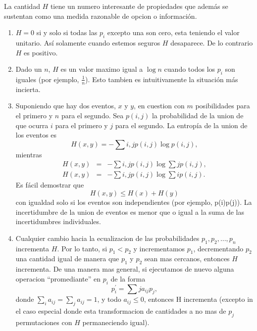 La cantidad $H$ tiene un numero interesante de propiedades que
adem\'{a}s se sustentan como una medida razonable de opcion o
informaci\'{o}n.
\begin{enumerate}
\item{$H = 0$ si y solo si todas las $p_{i}$ excepto una son cero,
  esta teniendo el valor unitario. As\'{i} solamente cuando estemos
  seguros $H$ desaparece. De lo contrario $H$ es positivo.}
\item{Dado un $n$, $H$ es un valor maximo igual a $\log n$ cuando
  todos los $p_{i}$ son iguales (por ejemplo, $\frac{1}{n}$). Esto
  tambien es intuitivamente la situaci\'{o}n m\'{a}s incierta.}
\item{Suponiendo que hay dos eventos, $x$ y $y$, en cuestion con $m$
  posibilidades para el primero y $n$ para el segundo. Sea $p(i,j)$ la
  probabilidad de la union de que ocurra $i$ para el primero y $j$
  para el segundo. La entrop\'{i}a de la union de los eventos es
  \begin{equation}
    H(x,y) = -\sum{i,j}{}p(i,j)\log p(i,j),
  \end{equation}
  mientras
  \begin{equation}
    \begin{array}{rcl}
      H(x,y) &=& -\sum{i,j}{}p(i,j)\log\sum{j}{}p(i,j), \\
      H(x,y) &=& -\sum{i,j}{}p(i,j)\log\sum{i}{}p(i,j).
    \end{array}
  \end{equation}
  Es f\'{a}cil demostrar que
  \begin{equation}
    H(x,y) \leq H(x) + H(y)
  \end{equation}
  con igualdad solo si los eventos son independientes (por ejemplo,
  p(i)p(j)). La incertidumbre de la union de eventos es menor que o
  igual a la suma de las incertidumbres individuales.}
\item{Cualquier cambio hacia la ecualizacion de las probabilidades
  $p_{1}, p_{2}, \ldots, p_{n}$ incrementa $H$. Por lo tanto, si
  $p_{1} < p_{2}$ y incrementamos $p_{1}$, decrementando $p_{2}$ una
  cantidad igual de manera que $p_{1}$ y $p_{2}$ sean mas cercanos,
  entonces $H$ incrementa. De una manera mas general, si ejecutamos de
  nuevo alguna operacion ``promediante'' en $p_{i}$ de la forma
  \begin{equation}
    p^{'}_{i} = \sum{j}{} a_{ij}p_{j},
  \end{equation}
  donde $\sum_{i} a_{ij} = \sum_{j} a_{ij} = 1$, y todo $a_{ij} \leq 0$, entonces H incrementa (excepto in el caso especial donde esta transformacion de cantidades a no mas de $p_{j}$ permutaciones con $H$ permaneciendo igual).}

\end{enumerate}
